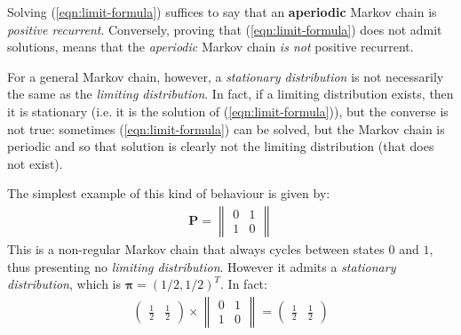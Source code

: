 \documentclass[../template.tex]{subfiles}
\begin{document}
Solving (\ref{eqn:limit-formula}) suffices to say that an \textbf{aperiodic} Markov chain is \textit{positive recurrent}. Conversely, proving that (\ref{eqn:limit-formula}) does not admit solutions, means that the \textit{aperiodic} Markov chain \textit{is not} positive recurrent.

For a general Markov chain, however, a \textit{stationary distribution} is not necessarily the same as the \textit{limiting distribution}. In fact, if a limiting distribution exists, then it is stationary (i.e. it is the solution of (\ref{eqn:limit-formula})), but the converse is not true: sometimes (\ref{eqn:limit-formula}) can be solved, but the Markov chain is periodic and so that solution is clearly not the limiting distribution (that does not exist). 

The simplest example of this kind of behaviour is given by:
\begin{align*}
    \textbf{P} = \begin{Vmatrix}
        0 & 1\\ 1 & 0
    \end{Vmatrix}
\end{align*}
This is a non-regular Markov chain that always cycles between states $0$ and $1$, thus presenting no \textit{limiting distribution}. However it admits a \textit{stationary distribution}, which is $\bm{\pi} = (1/2, 1/2)^T$. In fact:
\begin{align*}
    \left(\begin{array}{cc}
    \frac{1}{2}  & \frac{1}{2} 
    \end{array}\right) \times \begin{Vmatrix}
        0 & 1\\
        1 & 0
    \end{Vmatrix} = \left(\begin{array}{cc}
    \frac{1}{2}  & \frac{1}{2} 
    \end{array}\right)
\end{align*}  
\end{document}
